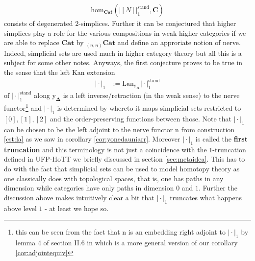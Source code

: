 \begin{cst}[Nerve]
\begin{align*}
  \mathrm{hom}_{\mathbf{Cat}}
  \left(
    \left\vert
      [N]
    \right\vert_{1}^{\textrm{stand}},
    \mathbf{C}
  \right)
\end{align*}
consists of degenerated $2$-simplices. Further it can be conjectured that higher simplices play a role for the various compositions in weak higher categories if we are able to replace $\mathbf{Cat}$ by ${}_{(n,n)}\mathbf{Cat}$ and define an approriate notion of nerve. Indeed, simplicial sets are used much in higher category theory but all this is a subject for some other notes. Anyways, the first conjecture proves to be true in the sense that the left Kan extension
\begin{align*}
  \vert
    \cdot
  \vert_{1}
  &:=
  \mathrm{Lan}_{\mathrm{y}_{\mathbf{\Delta}}}
  \vert
    \cdot
  \vert_{1}^{\textrm{stand}}
\end{align*}
of $\vert \cdot \vert_{1}^{\textrm{stand}}$ along $\mathrm{y}_{\mathbf{\Delta}}$ is a left inverse/retraction (in the weak sense) to the nerve functor\footnote{this can be seen from the fact that $\mathrm{n}$ is an embedding right adjoint to $\vert \cdot \vert_{1}$ by lemma $4$ of section II.6 in \cite{c55c71e8} which is a more general version of our corollary \ref{cor:adjointequiv}} and $\vert \cdot \vert_{1}$ is determined by whereto it maps simplicial sets restricted to $[0],[1],[2]$ and the order-preserving functions between those. Note that $\vert \cdot \vert_{1}$ can be chosen to be the left adjoint to the nerve functor $\mathrm{n}$ from construction \ref{cst:la} as we saw in corollary \ref{cor:yonedauniarr}. Moreover $\vert \cdot \vert_{1}$ is called the \textbf{first truncation} and this terminology is not just a coincidence with the $1$-truncation defined in UFP-HoTT we briefly discussed in section \ref{sec:metaidea}. This has to do with the fact that simplicial sets can be used to model homotopy theory as one classically does with topological spaces, that is, one has paths in any dimension while categories have only paths in dimension $0$ and $1$. Further the discussion above makes intuitively clear a bit that $\vert \cdot \vert_{1}$ truncates what happens above level $1$ - at least we hope so.
\end{cst}

